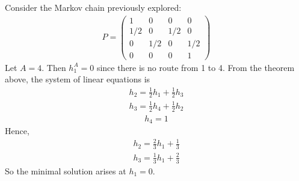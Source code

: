 \begin{example}
	Consider the Markov chain previously explored:
	\begin{align*}
		P = \begin{pmatrix}
			1   & 0   & 0   & 0   \\
			1/2 & 0   & 1/2 & 0   \\
			0   & 1/2 & 0   & 1/2 \\
			0   & 0   & 0   & 1
		\end{pmatrix}
	\end{align*}
	Let $A = \qty{4}$.
	Then $h_1^A = 0$ since there is no route from 1 to 4.
	From the theorem above, the system of linear equations is
	\begin{align*}
		h_2 = \frac{1}{2} h_1 + \frac{1}{2} h_3
	\end{align*}
	\begin{align*}
		h_3 = \frac{1}{2} h_4 + \frac{1}{2} h_2
	\end{align*}
	\begin{align*}
		h_4 = 1
	\end{align*}
	Hence,
	\begin{align*}
		h_2 = \frac{2}{3} h_1 + \frac{1}{3}
	\end{align*}
	\begin{align*}
		h_3 = \frac{1}{3} h_1 + \frac{2}{3}
	\end{align*}
	So the minimal solution arises at $h_1 = 0$.
\end{example}
